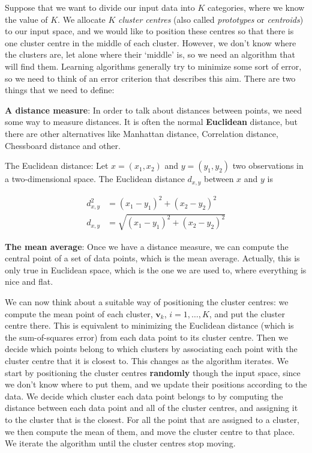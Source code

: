 \documentclass[]{book}
\begin{document}
Suppose that we want to divide our input data into \(K\) categories,
where we know the value of \(K\). We allocate \(K\) \emph{cluster
centres} (also called \emph{prototypes} or \emph{centroids}) to our
input space, and we would like to position these centres so that there
is one cluster centre in the middle of each cluster. However, we don't
know where the clusters are, let alone where their `middle' is, so we
need an algorithm that will find them. Learning algorithms generally try
to minimize some sort of error, so we need to think of an error
criterion that describes this aim. There are two things that we need to
define:

\textbf{A distance measure}: In order to talk about distances between
points, we need some way to measure distances. It is often the normal
\textbf{Euclidean} distance, but there are other alternatives like
Manhattan distance, Correlation distance, Chessboard distance and other.

The Euclidean distance: Let \(x=(x_1,x_2)\) and \(y=(y_1,y_2)\) two
observations in a two-dimensional space. The Euclidean distance
\(d_{x,y}\) between \(x\) and \(y\) is

\begin{align*}  
d_{x,y}^2 &= (x_1-y_1)^2+(x_2 - y_2)^2  \\
d_{x,y} &= \sqrt{(x_1-y_1)^2+(x_2 - y_2)^2}
\end{align*}

\textbf{The mean average}: Once we have a distance measure, we can
compute the central point of a set of data points, which is the mean
average. Actually, this is only true in Euclidean space, which is the
one we are used to, where everything is nice and flat.

We can now think about a suitable way of positioning the cluster
centres: we compute the mean point of each cluster, \(\textbf{v}_k\),
\(i=1,\ldots,K\), and put the cluster centre there. This is equivalent
to minimizing the Euclidean distance (which is the sum-of-squares error)
from each data point to its cluster centre. Then we decide which points
belong to which clusters by associating each point with the cluster
centre that it is closest to. This changes as the algorithm iterates. We
start by positioning the cluster centres \textbf{randomly} though the
input space, since we don't know where to put them, and we update their
positions according to the data. We decide which cluster each data point
belongs to by computing the distance between each data point and all of
the cluster centres, and assigning it to the cluster that is the
closest. For all the point that are assigned to a cluster, we then
compute the mean of them, and move the cluster centre to that place. We
iterate the algorithm until the cluster centres stop moving.
\end{document}
